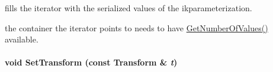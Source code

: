 fills the iterator with the serialized values of the ikparameterization. 

the container the iterator points to needs to have \hyperlink{classOpenRAVE_1_1IkParameterization_aba838fc410e5033a481e33d594ac72bd}{GetNumberOfValues()} available. \hypertarget{classOpenRAVE_1_1IkParameterization_a7526eb60609136e3393811ad4a28ca40}{
\paragraph[{SetTransform}]{\setlength{\rightskip}{0pt plus 5cm}void SetTransform (const Transform \& {\em t})}\hfill}
\label{classOpenRAVE_1_1IkParameterization_a7526eb60609136e3393811ad4a28ca40}
